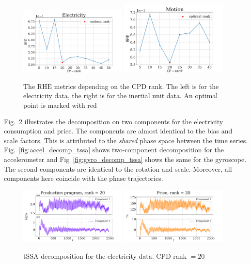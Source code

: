 \documentclass[referee, pdflatex, sn-mathphys-num]{sn-jnl}
\theoremstyle{definition}
\theoremstyle{plain}
\begin{document}
	\begin{figure}[h]
		\centering
		\includegraphics[width=0.48\textwidth, keepaspectratio]{RHE_mean_elec.png}
		\includegraphics[width=0.48\textwidth, keepaspectratio]{RHE_mean_motion.png}
		\caption{The $ \overline{\text{RHE}} $ metrics depending on the CPD rank. The left is for the electricity data, the right is for the inertial unit data. An optimal point is marked with red}\label{fig:decomp_rhe_rank}
	\end{figure}
	
	Fig.~\ref{fig:electr_decomp_tssa} illustrates the decomposition on two components for the electricity consumption and price. The components are almost identical to the bias and scale factors. This is attributed to the \emph{shared} phase space between the time series. Fig.~\ref{fig:accel_decomp_tssa} shows two-component decomposition for the accelerometer and Fig~\ref{fig:gyro_decomp_tssa} shows the same for the gyroscope. The second components are identical to the rotation and scale. Moreover, all components here coincide with the phase trajectories. 
	
	\begin{figure}[h]
		\centering
		\includegraphics[width=0.48\textwidth, keepaspectratio]{Production program_decomp.png}
		\includegraphics[width=0.48\textwidth, keepaspectratio]{Price_decomp.png}
		\caption{tSSA decomposition for the electricity data. CPD rank $ = 20 $}\label{fig:electr_decomp_tssa}
	\end{figure}
	
\end{document}
